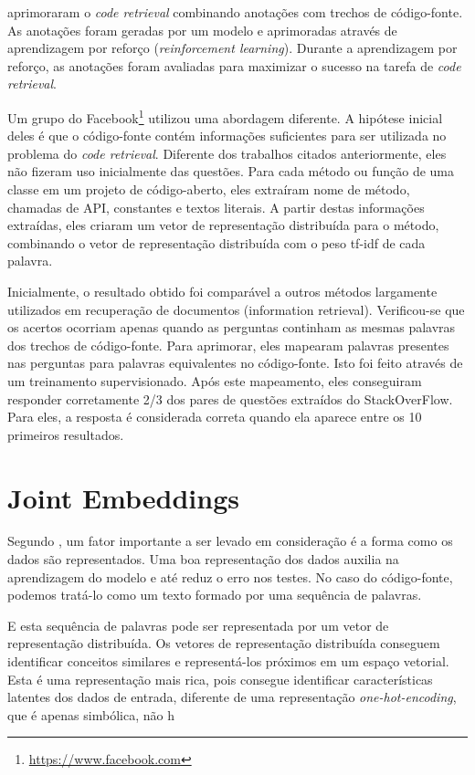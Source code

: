 \cite{Yao-coacor:2019} aprimoraram o \textit{code retrieval} combinando anotações com trechos de código-fonte. As anotações foram geradas por um modelo e aprimoradas através de aprendizagem por reforço (\textit{reinforcement learning}). Durante a aprendizagem por reforço, as anotações foram avaliadas para maximizar o sucesso na tarefa de \textit{code retrieval}.

Um grupo do Facebook\footnote{\url{https://www.facebook.com}}\citep{Sachdev-neural-code-search:2018} utilizou uma abordagem diferente. A hipótese inicial deles é que o código-fonte contém informações suficientes para ser utilizada no problema do \textit{code retrieval}. Diferente dos trabalhos citados anteriormente, eles não fizeram uso inicialmente das questões. Para cada método ou função de uma classe em um projeto de código-aberto, eles extraíram nome de método, chamadas de API, constantes e textos literais. A partir destas informações extraídas, eles criaram um vetor de representação distribuída para o método, combinando o vetor de representação distribuída com o peso \acrshort{tf-idf} de cada palavra. 

Inicialmente, o resultado obtido foi comparável a outros métodos largamente utilizados em recuperação de documentos (information retrieval). Verificou-se que os acertos ocorriam apenas quando as perguntas continham as mesmas palavras dos trechos de código-fonte. Para aprimorar, eles mapearam palavras presentes nas perguntas para palavras equivalentes no código-fonte. Isto foi feito através de um treinamento supervisionado. Após este mapeamento, eles conseguiram responder corretamente 2/3 dos pares de questões extraídos do StackOverFlow. Para eles, a resposta é considerada correta quando ela aparece entre os 10 primeiros resultados.

\section{Joint Embeddings}

Segundo \cite{Goodfellow-et-al-2016:representation-learning}, um fator importante a ser levado em consideração é a forma como os dados são representados. Uma boa representação dos dados auxilia na aprendizagem do modelo e até reduz o erro nos testes. No caso do código-fonte, podemos tratá-lo como um texto formado por uma sequência de palavras.

E esta sequência de palavras pode ser representada por um vetor de representação distribuída. Os vetores de representação distribuída conseguem identificar conceitos similares e representá-los próximos em um espaço vetorial. Esta é uma representação mais rica, pois consegue identificar características latentes dos dados de entrada, diferente de uma representação \textit{one-hot-encoding}, que é apenas simbólica, não h


